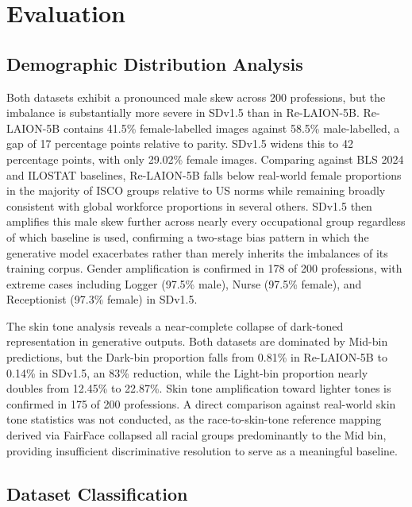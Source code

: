 \section{Evaluation}

\subsection{Demographic Distribution Analysis}

Both datasets exhibit a pronounced male skew across 200 professions, but the imbalance
is substantially more severe in SDv1.5 than in Re-LAION-5B. Re-LAION-5B contains
41.5\% female-labelled images against 58.5\% male-labelled, a gap of 17 percentage
points relative to parity. SDv1.5 widens this to 42 percentage points, with only
29.02\% female images. Comparing against BLS 2024 and ILOSTAT baselines, Re-LAION-5B
falls below real-world female proportions in the majority of ISCO groups relative to
US norms while remaining broadly consistent with global workforce proportions in
several others. SDv1.5 then amplifies this male skew further across nearly every
occupational group regardless of which baseline is used, confirming a two-stage bias
pattern in which the generative model exacerbates rather than merely inherits the
imbalances of its training corpus. Gender amplification is confirmed in 178 of 200
professions, with extreme cases including Logger (97.5\% male), Nurse (97.5\% female),
and Receptionist (97.3\% female) in SDv1.5.

The skin tone analysis reveals a near-complete collapse of dark-toned representation in
generative outputs. Both datasets are dominated by Mid-bin predictions, but the Dark-bin
proportion falls from 0.81\% in Re-LAION-5B to 0.14\% in SDv1.5, an 83\% reduction,
while the Light-bin proportion nearly doubles from 12.45\% to 22.87\%. Skin tone
amplification toward lighter tones is confirmed in 175 of 200 professions. A direct
comparison against real-world skin tone statistics was not conducted, as the
race-to-skin-tone reference mapping derived via FairFace collapsed all racial groups
predominantly to the Mid bin, providing insufficient discriminative resolution to serve
as a meaningful baseline.

\subsection{Dataset Classification}


